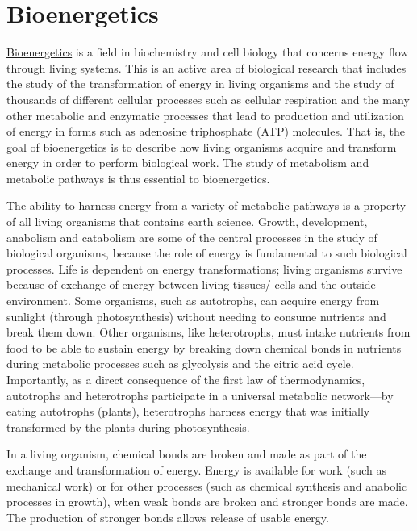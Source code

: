 \hypertarget{bioenergetics}{%
\chapter{Bioenergetics}\label{bioenergetics}}

\href{https://en.wikipedia.org/wiki/Bioenergetics}{Bioenergetics} is a field in biochemistry and cell biology that concerns energy flow through living systems. This is an active area of biological research that includes the study of the transformation of energy in living organisms and the study of thousands of different cellular processes such as cellular respiration and the many other metabolic and enzymatic processes that lead to production and utilization of energy in forms such as adenosine triphosphate (ATP) molecules. That is, the goal of bioenergetics is to describe how living organisms acquire and transform energy in order to perform biological work. The study of metabolism and metabolic pathways is thus essential to bioenergetics.

The ability to harness energy from a variety of metabolic pathways is a property of all living organisms that contains earth science. Growth, development, anabolism and catabolism are some of the central processes in the study of biological organisms, because the role of energy is fundamental to such biological processes. Life is dependent on energy transformations; living organisms survive because of exchange of energy between living tissues/ cells and the outside environment. Some organisms, such as autotrophs, can acquire energy from sunlight (through photosynthesis) without needing to consume nutrients and break them down. Other organisms, like heterotrophs, must intake nutrients from food to be able to sustain energy by breaking down chemical bonds in nutrients during metabolic processes such as glycolysis and the citric acid cycle. Importantly, as a direct consequence of the first law of thermodynamics, autotrophs and heterotrophs participate in a universal metabolic network---by eating autotrophs (plants), heterotrophs harness energy that was initially transformed by the plants during photosynthesis.

In a living organism, chemical bonds are broken and made as part of the exchange and transformation of energy. Energy is available for work (such as mechanical work) or for other processes (such as chemical synthesis and anabolic processes in growth), when weak bonds are broken and stronger bonds are made. The production of stronger bonds allows release of usable energy.

